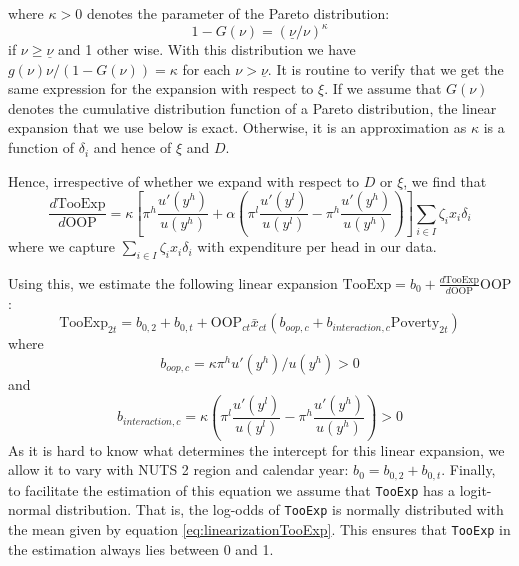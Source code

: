 \documentclass[a4paper,12pt]{article}
\begin{document}
where \(\kappa > 0\) denotes the parameter of the Pareto distribution:
\begin{equation}
1-G(\nu) = \left( \underline \nu/{\nu} \right)^{\kappa}
\end{equation}
if \(\nu \geq \underline \nu\) and 1 other wise. With this distribution we have \(g(\nu)\nu/(1-G(\nu)) = \kappa\) for each \(\nu > \underline \nu\). It is routine to verify that we get the same expression for the expansion with respect to \(\xi\). If we assume that \(G(\nu)\) denotes the cumulative distribution function of a Pareto distribution, the linear expansion that we use below is exact. Otherwise, it is an approximation as \(\kappa\) is a function of \(\delta_i\) and hence of \(\xi\) and \(D\).

Hence, irrespective of whether we expand with respect to \(D\) or \(\xi\), we find that
\begin{equation}
\frac{d \text{TooExp}}{d \text{OOP}} = \kappa \left[ \pi^h \frac{u'(y^{h})}{u(y^h)} + \alpha \left( \pi^l \frac{u'(y^{l})}{u(y^l)}- \pi^h \frac{u'(y^{h})}{u(y^h)}  \right)
\right] \sum_{i \in I} \zeta_i x_i \delta_i
\end{equation}
where we capture \(\sum_{i \in I} \zeta_i x_i \delta_i\) with expenditure per head in our data.

Using this, we estimate the following linear expansion \(\text{TooExp} = b_0 + \frac{d \text{TooExp}}{d \text{OOP}} \text{OOP}\):
\begin{equation}
\label{eq:linearizationTooExp}
\text{TooExp}_{2t} = b_{0,2} + b_{0,t} +  \text{OOP}_{ct} \bar x_{ct} \left( b_{oop,c}+ b_{interaction,c} \text{Poverty}_{2t} \right)
\end{equation}
where
\begin{equation}
b_{oop,c} = \kappa \pi^h u'(y^h)/u(y^h) >0
\end{equation}
and
\begin{equation}
b_{interaction,c} = \kappa \left( \pi^l \frac{u'(y^{l})}{u(y^l)}- \pi^h \frac{u'(y^{h})}{u(y^h)}  \right) > 0
\end{equation}
As it is hard to know what determines the intercept for this linear expansion, we allow it to vary with NUTS 2 region and calendar year: \(b_0 = b_{0,2} + b_{0,t}\). Finally, to facilitate the estimation of this equation we assume that \texttt{TooExp} has a logit-normal distribution. That is, the log-odds of \texttt{TooExp} is normally distributed with the mean given by equation \eqref{eq:linearizationTooExp}. This ensures that \texttt{TooExp} in the estimation always lies between 0 and 1.
\end{document}

